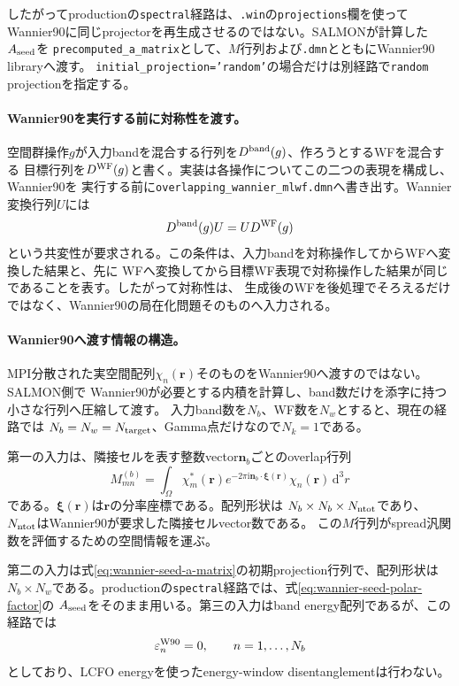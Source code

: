 \documentclass[11pt,a4paper]{article}
\newcommand{\dd}{\mathrm d}
\newcommand{\code}[1]{\texttt{#1}}
\begin{document}
したがってproductionの\code{spectral}経路は、\code{.win}の\code{projections}欄を使って
Wannier90に同じprojectorを再生成させるのではない。SALMONが計算した$A_{\rm seed}$を
\code{precomputed\_a\_matrix}として、$M$行列および\code{.dmn}とともにWannier90 libraryへ渡す。
\code{initial\_projection='random'}の場合だけは別経路で\code{random} projectionを指定する。

\paragraph{Wannier90を実行する前に対称性を渡す。}
空間群操作$g$が入力bandを混合する行列を$D^{\rm band}(g)$、作ろうとするWFを混合する
目標行列を$D^{\rm WF}(g)$と書く。実装は各操作についてこの二つの表現を構成し、Wannier90を
実行する前に\code{overlapping\_wannier\_mlwf.dmn}へ書き出す。Wannier変換行列$U$には
\begin{equation}
 D^{\rm band}(g)U=UD^{\rm WF}(g)
 \label{eq:wannier-intertwining-condition}
\end{equation}
という共変性が要求される。この条件は、入力bandを対称操作してからWFへ変換した結果と、先に
WFへ変換してから目標WF表現で対称操作した結果が同じであることを表す。したがって対称性は、
生成後のWFを後処理でそろえるだけではなく、Wannier90の局在化問題そのものへ入力される。

\paragraph{Wannier90へ渡す情報の構造。}
MPI分散された実空間配列$\chi_n(\boldsymbol r)$そのものをWannier90へ渡すのではない。SALMON側で
Wannier90が必要とする内積を計算し、band数だけを添字に持つ小さな行列へ圧縮して渡す。
入力band数を$N_b$、WF数を$N_w$とすると、現在の経路では
$N_b=N_w=N_{\rm target}$、Gamma点だけなので$N_k=1$である。

第一の入力は、隣接セルを表す整数vector$\boldsymbol n_b$ごとのoverlap行列
\begin{equation}
 M_{mn}^{(b)}=\int_\Omega\chi_m^*(\boldsymbol r)
 e^{-2\pi\mathrm i\boldsymbol n_b\cdot\boldsymbol\xi(\boldsymbol r)}
 \chi_n(\boldsymbol r)\,\dd^3r
 \label{eq:wannier-m-matrix-interface}
\end{equation}
である。$\boldsymbol\xi(\boldsymbol r)$は$\boldsymbol r$の分率座標である。配列形状は
$N_b\times N_b\times N_{\rm ntot}$であり、$N_{\rm ntot}$はWannier90が要求した隣接セルvector数である。
この$M$行列がspread汎関数を評価するための空間情報を運ぶ。

第二の入力は式\eqref{eq:wannier-seed-a-matrix}の初期projection行列で、配列形状は
$N_b\times N_w$である。productionの\code{spectral}経路では、式\eqref{eq:wannier-seed-polar-factor}の
$A_{\rm seed}$をそのまま用いる。第三の入力はband energy配列であるが、この経路では
\begin{equation}
 \varepsilon_n^{\rm W90}=0,
 \qquad n=1,\ldots,N_b
 \label{eq:wannier-zero-interface-energy}
\end{equation}
としており、LCFO energyを使ったenergy-window disentanglementは行わない。
\end{document}
